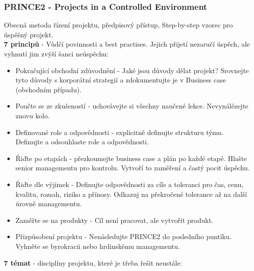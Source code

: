 \documentclass[11pt,a4paper]{article}
\begin{document}
    \subsubsection{PRINCE2 - Projects in a Controlled Environment}
        Obecná metoda řízení projektu, předpisový přístup, Step-by-step vzorec pro úspěšný projekt.\\
        \textbf{7 principů} - Vůdčí povinnosti a best practises. Jejich přijetí nezaručí úspěch, ale vyhnutí jim zvýší šanci neúspěchu:
        \begin{itemize}
            \item Pokračující obchodní zdůvodnění - Jaké jsou důvody dělat projekt? Srovnejte tyto důvody s korporátní strategií a zdokumentujte je v Business case (obchodním případu).
            \item Poučte se ze zkušeností - uchovávejte si všechny naučené lekce. Nevynálézejte znovu kolo.
            \item Definované role a odpovědnosti - explicitně definujte strukturu týmu. Definujte a odsouhlaste role a odpovědnosti.
            \item Řiďte po etapách - přezkoumejte business case a plán po každé etapě. Hlašte senior managementu pro kontrolu. Vytvoří to zaměření a častý pocit úspěchu.
            \item Řiďte dle výjimek - Definujte odpovědnosti za cíle a toleranci pro čas, cenu, kvalitu, rozsah, riziko a přínosy. Odkazuj na překročené tolerance až na další úrovně managementu.
            \item Zaměřte se na produkty - Cíl není pracovat, ale vytvořit produkt.
            \item Přizpůsobení projektu - Nenásledujte PRINCE2 do posledního puntíku. Vyhněte se byrokracii nebo hrdinskému managementu.
        \end{itemize}
        \textbf{7 témat} - disciplíny projektu, které je třeba řešit neustále:
\end{document}

